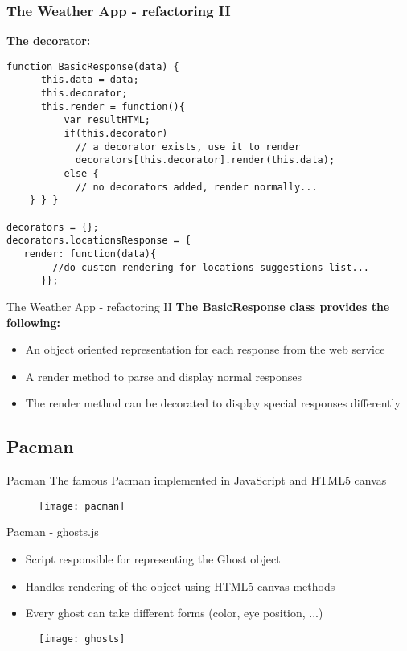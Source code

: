 \documentclass{beamer}
\begin{document}
\begin{frame}[fragile]
\frametitle{The Weather App - refactoring II}
\textbf{The decorator:}
\begin{lstlisting}
function BasicResponse(data) {
	  this.data = data;
	  this.decorator;
	  this.render = function(){
		  var resultHTML;
		  if(this.decorator)
			// a decorator exists, use it to render
			decorators[this.decorator].render(this.data);
		  else {
			// no decorators added, render normally...
	} } }

decorators = {};
decorators.locationsResponse = {
   render: function(data){
		//do custom rendering for locations suggestions list...
	  }};
\end{lstlisting}
\end{frame}

\begin{frame}{The Weather App - refactoring II}
\textbf{The BasicResponse class provides the following:}
\begin{itemize}
    \item An object oriented representation for each response from the web service
    \item A render method to parse and display normal responses
    \item The render method can be decorated to display special responses differently 
\end{itemize}
\end{frame}


\subsection{Pacman}
\begin{frame}{Pacman}
The famous Pacman implemented in JavaScript and HTML5 canvas
    \begin{figure}[htp]
    \centering
    \texttt{[image: pacman]}
    \label{fig:pacman}
    \end{figure}
    
\end{frame}

\begin{frame}{Pacman - ghosts.js}
\begin{itemize}
\item Script responsible for representing the Ghost object
\item Handles rendering of the object using HTML5 canvas methods
\item Every ghost can take different forms (color, eye position, ...)
\end{itemize}

    \begin{figure}[htp]
    \centering
    \texttt{[image: ghosts]}
    \label{fig:ghosts}
    \end{figure}
\end{frame}
\end{document}
